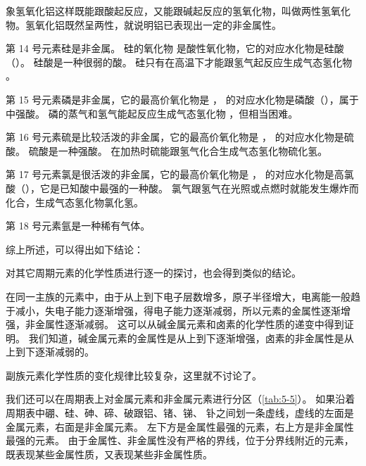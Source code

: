 象氢氧化铝这样既能跟酸起反应，又能跟碱起反应的氢氧化物，叫做两性氢氧化物。氢氧化铝既然呈两性，就说明铝已表现出一定的非金属性。

第 14 号元素硅是非金属。
硅的氧化物  是酸性氧化物，它的对应水化物是硅酸（）。
硅酸是一种很弱的酸。 
硅只有在高温下才能跟氢气起反应生成气态氢化物 。

第 15 号元素磷是非金属，它的最高价氧化物是 ， 的对应水化物是磷酸（），属于中强酸。
磷的蒸气和氢气能起反应生成气态氢化物 ，但相当困难。

第 16 号元素硫是比较活泼的非金属，它的最高价氧化物是 ， 的对应水化物是硫酸。
硫酸是一种强酸。
在加热时硫能跟氢气化合生成气态氢化物硫化氢。

第 17 号元素氯是很活泼的非金属，它的最高价氧化物是 ， 的对应水化物是高氯酸（），它是已知酸中最强的一种酸。
氯气跟氢气在光照或点燃时就能发生爆炸而化合，生成气态氢化物氯化氢。

第 18 号元素氩是一种稀有气体。

综上所述，可以得出如下结论：
\begin{center}
\end{center}

对其它周期元素的化学性质进行逐一的探讨，也会得到类似的结论。

在同一主族的元素中，由于从上到下电子层数增多，原子半径增大，电离能一般趋于减小，失电子能力逐渐增强，得电子能力逐渐减弱，所以元素的金属性逐渐增强，非金属性逐渐减弱。
这可以从碱金属元素和卤素的化学性质的递变中得到证明。
我们知道，碱金属元素的金属性是从上到下逐渐增强，卤素的非金属性是从上到下逐渐减弱的。

副族元素化学性质的变化规律比较复杂，这里就不讨论了。

我们还可以在周期表上对金属元素和非金属元素进行分区（\cref{tab:5-5}）。
如果沿着周期表中硼、硅、砷、碲、破跟铝、锗、锑、 钋之间划一条虚线，虚线的左面是金属元素，右面是非金属元素。
左下方是金属性最强的元素，右上方是非金属性最强的元素。
由于金属性、非金属性没有严格的界线，位于分界线附近的元素，既表现某些金属性质，又表现某些非金属性质。


